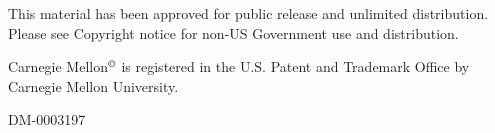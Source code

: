  This material has been approved for public release and unlimited distribution. Please see Copyright notice for non-US Government use and distribution.

\noindent Carnegie Mellon$^\copyright$ is registered in the U.S. Patent and Trademark Office by Carnegie Mellon University.

\noindent DM-0003197

{}


